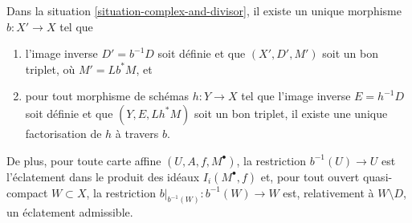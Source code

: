 \begin{lemma}
\label{lemma-complex-and-divisor-blowup-pre}
Dans la situation \ref{situation-complex-and-divisor},
il existe un unique morphisme $b : X' \to X$ tel que
\begin{enumerate}
\item l'image inverse $D' = b^{-1}D$ soit définie et que
$(X', D', M')$ soit un bon triplet, où $M' = Lb^*M$, et
\item pour tout morphisme de schémas $h : Y \to X$ tel que
l'image inverse $E = h^{-1}D$ soit définie et que $(Y, E, Lh^*M)$
soit un bon triplet, il existe une unique factorisation de $h$ à travers $b$.
\end{enumerate}
De plus, pour toute carte affine $(U, A, f, M^\bullet)$, la restriction
$b^{-1}(U) \to U$ est l'éclatement dans le produit des idéaux
$I_i(M^\bullet, f)$ et, pour tout ouvert quasi-compact $W \subset X$, la
restriction $b|_{b^{-1}(W)} : b^{-1}(W) \to W$ est, relativement à $W \setminus D$, un
éclatement admissible.
\end{lemma}

